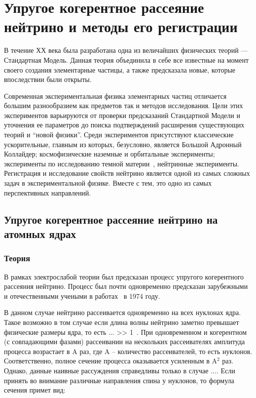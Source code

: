 \chapter{Упругое когерентное рассеяние нейтрино и методы его регистрации} \label{chapt1}
В течение ХХ века была разработана одна из величайших физических теорий — Стандартная Модель. Данная теория объединила в себе все известные на момент своего создания элементарные частицы, а также предсказала новые, которые впоследствии были открыты.
\par Современная экспериментальная физика элементарных частиц отличается большим разнообразием как предметов так и методов исследования. Цели этих экспериментов варьируются от проверки предсказаний Стандартной Модели и уточнения ее параметров до поиска подтверждений расширения существующих теорий и “новой физики”.  Среди экспериментов присутствуют классические ускорительные, главным из которых, безусловно, является Большой Адронный Коллайдер; космофизические наземные и орбитальные эксперименты; эксперименты по исследованию темной материи~\cite{Cebrian:2022brv}, нейтринные эксперименты. Регистрация и исследование свойств нейтрино является одной из самых сложных задач в экспериментальной физике. Вместе с тем, это одно из самых перспективных направлений.
\section{Упругое когерентное рассеяние нейтрино на атомных ядрах} \label{sect1_1}
\subsection{Теория}
\label{subsect1_1_1}
В рамках электрослабой теории был предсказан процесс упругого когерентного рассеяния нейтрино. Процесс был почти одновременно предсказан зарубежными и отечественными учеными в работах~\cite{Freedman, Kopeliovich:1974mv} в 1974 году. 

В данном случае нейтрино рассеивается одновременно на всех нуклонах ядра. Такое возможно в том случае если длина волны нейтрино заметно превышает физические размеры ядра, то есть ... >> 1~\cite{Freedman:1977xn}. При одновременном и когерентном (с совпадающими фазами) рассеивании на нескольких рассеивателях амплитуда процесса возрастает в A раз, где A -- количество рассеивателей, то есть нуклонов. Соответственно, полное сечение процесса оказывается усиленным в A$^2$ раз. Однако, данные наивные рассуждения справедливы только в случае .... Если принять во внимание различные направления спина у нуклонов, то формула сечения примет вид:

